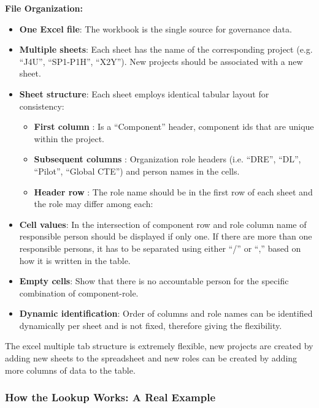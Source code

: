 \noindent\textbf{File Organization:}

\begin{itemize}
    \item[\quad\textbullet] \textbf{One Excel file}: The workbook is the single source for governance data.
    \item[\quad\textbullet] \textbf{Multiple sheets}: Each sheet has the name of the corresponding project (e.g. “J4U”, “SP1-P1H”, “X2Y”). New projects should be associated with a new sheet.
    \item[\quad\textbullet] \textbf{Sheet structure}: Each sheet employs identical tabular layout for consistency:
    \begin{itemize}[leftmargin=0.5cm]
        \item \textcolor[HTML]{003D99}{\textbf{First column}} :  Is a “Component” header, component ids that are unique within the project.
        \item \textcolor[HTML]{003D99}{\textbf{Subsequent columns}} :  Organization role headers (i.e. “DRE”, “DL”, “Pilot”, “Global CTE”) and person names in the cells.
        \item \textcolor[HTML]{003D99}{\textbf{Header row}} : The role name should be in the first row of each sheet and the role may differ among each:
    \end{itemize}
    \item[\quad\textbullet] \textbf{Cell values}: In the intersection of component row and role column name of responsible person should be displayed if only one. If there are more than one responsible persons, it has to be separated using either “/” or “,” based on how it is written in the table.
    \item[\quad\textbullet] \textbf{Empty cells}: Show that there is no accountable person for the specific combination of component-role.
    \item[\quad\textbullet] \textbf{Dynamic identification}:  Order of columns and role names can be identified dynamically per sheet and is not fixed, therefore giving the flexibility.
\end{itemize}

\noindent The excel multiple tab structure is extremely flexible, new projects are created by adding new sheets to the spreadsheet and new roles can be created by adding more columns of data to the table.



\subsubsection{\textcolor[HTML]{0066CC}{How the Lookup Works: A Real Example}}

